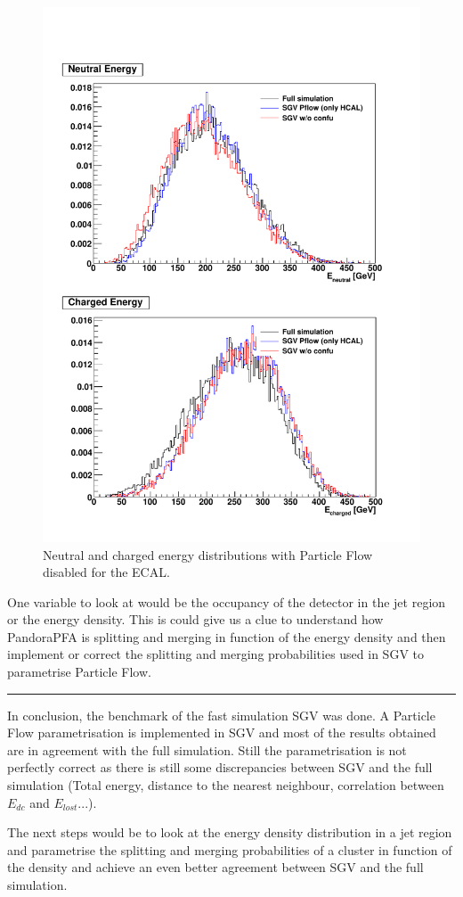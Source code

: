\begin{figure}[t]
  \centering
  \includegraphics[width=1\linewidth]{chap6/fig_SGV/Total_EneuEcha_notjet_onlyHCAL.pdf}
  \caption{Neutral and charged energy distributions with Particle Flow disabled for the ECAL.}
  \label{fig:energy_ECALnoPFA}
\end{figure}

One variable to look at would be the occupancy of the detector in the jet region or the energy density. This is could give us a clue to understand how PandoraPFA is splitting and merging in function of the energy density and then implement or correct the splitting and merging probabilities used in SGV to parametrise Particle Flow.

\begin{center}
\rule{0.5\textwidth}{.4pt}
\end{center}

In conclusion, the benchmark of the fast simulation SGV was done. A Particle Flow parametrisation is implemented in SGV and most of the results obtained are in agreement with the full simulation. Still the parametrisation is not perfectly correct as there is still some discrepancies between SGV and the full simulation (Total energy, distance to the nearest neighbour, correlation between $E_{dc}$ and $E_{lost}$...).

The next steps would be to look at the energy density distribution in a jet region and parametrise the splitting and merging probabilities of a cluster in function of the density and achieve an even better agreement between SGV and the full simulation.
